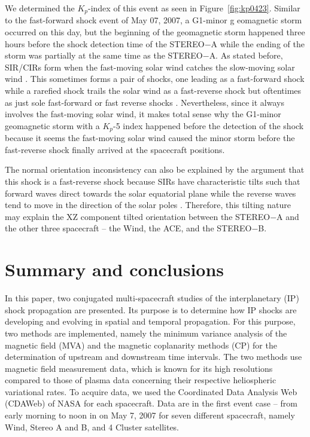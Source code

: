 \documentclass[draft]{agujournal2019}
\begin{document}
We determined the $K_{p}$-index of this event as seen in Figure~\ref{fig:kp0423}. Similar to the fast-forward shock event of May 07, 2007, a G1-minor g
eomagnetic storm occurred on this day, but the beginning of the geomagnetic storm happened three hours before the shock detection time of the STEREO$-$A while the ending of the storm was partially at the same time as the STEREO$-$A. As stated before, SIR/CIRs form when the fast-moving solar wind catches the slow-moving solar wind \cite{richardson18:_solar}. This sometimes forms a pair of shocks, one leading as a fast-forward shock while a rarefied shock trails the solar wind as a fast-reverse shock but oftentimes as just sole fast-forward or fast reverse shocks \cite{jian19:_solar_terres_relat_obser_stereo}. Nevertheless, since it always involves the fast-moving solar wind, it makes total sense why the G1-minor geomagnetic storm with a $K_{p}$-5 index happened before the detection of the shock because it seems the fast-moving solar wind caused the minor storm before the fast-reverse shock finally arrived at the spacecraft positions.

The normal orientation inconsistency can also be explained by the argument that this shock is a fast-reverse shock because SIRs have characteristic tilts such that forward waves direct towards the solar equatorial plane while the reverse waves tend to move in the direction of the solar poles \cite{kilpua15:_proper_earth}. Therefore, this tilting nature may explain the XZ component tilted orientation between the STEREO$-$A and the other three spacecraft -- the Wind, the ACE, and the STEREO$-$B. 
 
\section{Summary and conclusions}
\label{sec:summary}

In this paper, two conjugated multi-spacecraft studies of the interplanetary (IP) shock propagation are presented. Its purpose is to determine how IP shocks are developing and evolving in spatial and temporal propagation. For this purpose, two methods are implemented, namely the minimum variance analysis of the magnetic field (MVA) and the magnetic coplanarity methods (CP) for the determination of upstream and downstream time intervals. The two methods use magnetic field measurement data, which is known for its high resolutions compared to those of plasma data concerning their respective heliospheric variational rates. To acquire data, we used the Coordinated Data Analysis Web (CDAWeb) of NASA for each spacecraft. Data are in the first event case – from early morning to noon in on May 7, 2007 for seven different spacecraft, namely Wind, Stereo A and B, and 4 Cluster satellites. 
\end{document}

